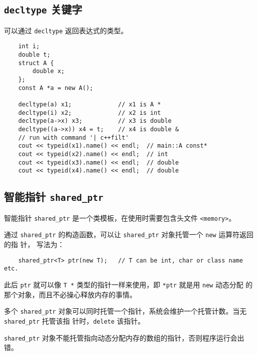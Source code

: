 \documentclass[UTF8]{ctexart}
\begin{document}
\subsection{\texttt{decltype} 关键字}
可以通过 \texttt{decltype} 返回表达式的类型。
\begin{verbatim}
    int i;
    double t;
    struct A {
        double x;
    };
    const A *a = new A();

    decltype(a) x1;             // x1 is A *
    decltype(i) x2;             // x2 is int
    decltype(a->x) x3;          // x3 is double
    decltype((a->x)) x4 = t;    // x4 is double &
    // run with command '| c++filt'
    cout << typeid(x1).name() << endl;  // main::A const*
    cout << typeid(x2).name() << endl;  // int
    cout << typeid(x3).name() << endl;  // double
    cout << typeid(x4).name() << endl;  // double
\end{verbatim}

\subsection{智能指针 \texttt{shared\_ptr}}
智能指针 \texttt{shared\_ptr} 是一个类模板，在使用时需要包含头文件 \texttt{<memory>}。

通过 \texttt{shared\_ptr} 的构造函数，可以让 \texttt{shared\_ptr} 对象托管一个 \texttt{new} 运算符返回的指
针， 写法为：
\begin{verbatim}
    shared_ptr<T> ptr(new T);   // T can be int, char or class name etc.
\end{verbatim}
此后 \texttt{ptr} 就可以像 \texttt{T *} 类型的指针一样来使用，即 \texttt{*ptr} 就是用 \texttt{new} 动态分配
的那个对象，而且不必操心释放内存的事情。

多个 \texttt{shared\_ptr} 对象可以同时托管一个指针，系统会维护一个托管计数。当无 \texttt{shared\_ptr} 托管该指
针时，\texttt{delete} 该指针。

\texttt{shared\_ptr} 对象不能托管指向动态分配内存的数组的指针，否则程序运行会出错。
\end{document}
